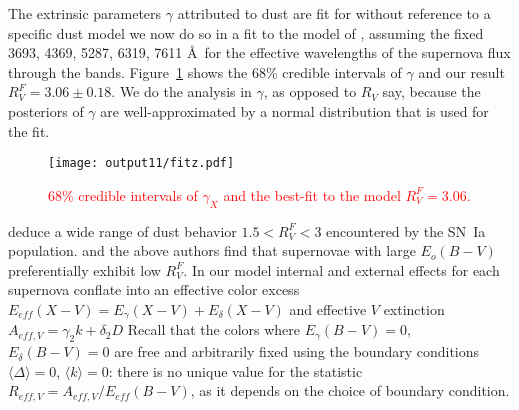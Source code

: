 \documentclass{aastex}   	%
\begin{document}
\color{black}

\color{red}
The extrinsic parameters $\gamma$ attributed to dust are fit for without reference to a specific dust model
we now do so in a fit to the 
model of \citet{1999PASP..111...63F},
assuming the fixed 3693,  4369,  5287,  6319, 7611 \AA\  for the effective wavelengths of the supernova flux through the bands.
Figure~\ref{fitz:fig} shows the   68\% credible intervals of $\gamma$ and our result
$R^F_V=3.06\pm 0.18$.  
We do the analysis in $\gamma$, as opposed to $R_V$ say, because the posteriors of $\gamma$ are well-approximated by a normal distribution that is used for the fit.
\color{black}

\begin{figure}[htbp] %
   \centering
   \texttt{[image: output11/fitz.pdf]}
   \caption{\textcolor{red}{68\% credible intervals of $\gamma_X$ and the best-fit to the  \citet{1999PASP..111...63F}  model $R^F_V=3.06$.}
   \label{fitz:fig}}
\end{figure}


\citet{2014ApJ...789...32B, 2015MNRAS.453.3300A} deduce a wide range of dust behavior $1.5<R^F_V<3$ encountered by the SN~Ia population.
\citet{2011ApJ...731..120M, 2011ApJ...729...55F} and the above authors
find that supernovae with large $E_o(B-V)$ 
preferentially exhibit low $R^F_V$. 
\color{red}
In our model internal and external effects for each supernova  conflate into an effective color excess
$E_{eff}(X-V) = E_\gamma(X-V) + E_\delta(X-V)$ and effective $V$ extinction $A_{eff,V} = \gamma_2 k  + \delta_2 D$ 
Recall that the colors where $E_\gamma(B-V)=0$,  $E_\delta(B-V)=0$ are free and arbitrarily
fixed using the  boundary conditions $\langle \Delta \rangle = 0$, $\langle k \rangle = 0$:
there is no unique value for the statistic $R_{eff,V} = A_{eff,V} /E_{eff}(B-V)$, as it depends on the choice of  boundary condition.
\end{document}
